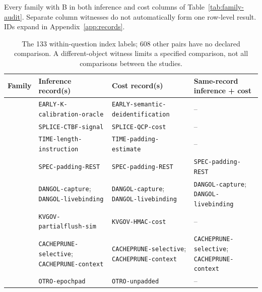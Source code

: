 \begin{table}[t]
\centering\scriptsize
\caption{Every family with B in both inference and cost columns of Table~\ref{tab:family-audit}. Separate column witnesses do not automatically form one row-level result. IDs expand in Appendix~\ref{app:records}.}\label{tab:r33-crosswalk}
\begin{tabularx}{\textwidth}{@{}p{}YYY@{}}\toprule
Family & Inference record(s) & Cost record(s) & Same-record inference + cost\\\midrule
\cite{earlybird2025} & \texttt{EARLY-\allowbreak{}K-\allowbreak{}calibration-\allowbreak{}oracle} & \texttt{EARLY-\allowbreak{}semantic-\allowbreak{}deidentification} & --\\
\cite{spliceleak2026} & \texttt{SPLICE-\allowbreak{}CTBF-\allowbreak{}signal} & \texttt{SPLICE-\allowbreak{}QCP-\allowbreak{}cost} & --\\
\cite{timewilltell2024} & \texttt{TIME-\allowbreak{}length-\allowbreak{}instruction} & \texttt{TIME-\allowbreak{}padding-\allowbreak{}estimate} & --\\
\cite{wei2024speculation} & \texttt{SPEC-\allowbreak{}padding-\allowbreak{}REST} & \texttt{SPEC-\allowbreak{}padding-\allowbreak{}REST} & \texttt{SPEC-\allowbreak{}padding-\allowbreak{}REST}\\
\cite{dangol2026workflow} & \texttt{DANGOL-\allowbreak{}capture}; \texttt{DANGOL-\allowbreak{}livebinding} & \texttt{DANGOL-\allowbreak{}capture}; \texttt{DANGOL-\allowbreak{}livebinding} & \texttt{DANGOL-\allowbreak{}capture}; \texttt{DANGOL-\allowbreak{}livebinding}\\
\cite{addagada2026kvgov} & \texttt{KVGOV-\allowbreak{}partialflush-\allowbreak{}sim} & \texttt{KVGOV-\allowbreak{}HMAC-\allowbreak{}cost} & --\\
\cite{wu2026cacheprune} & \texttt{CACHEPRUNE-\allowbreak{}selective}; \texttt{CACHEPRUNE-\allowbreak{}context} & \texttt{CACHEPRUNE-\allowbreak{}selective}; \texttt{CACHEPRUNE-\allowbreak{}context} & \texttt{CACHEPRUNE-\allowbreak{}selective}; \texttt{CACHEPRUNE-\allowbreak{}context}\\
\cite{lee2026otro} & \texttt{OTRO-\allowbreak{}epochpad} & \texttt{OTRO-\allowbreak{}unpadded} & --\\
\bottomrule\end{tabularx}\par\bigskip
\begin{minipage}[t]{.49\textwidth}\centering\footnotesize
\caption{The 133 within-question index labels; 608 other pairs have no declared comparison. A different-object witness limits a specified comparison, not all comparisons between the studies.}\label{tab:r33-pairs}

\end{minipage}
\end{table}
